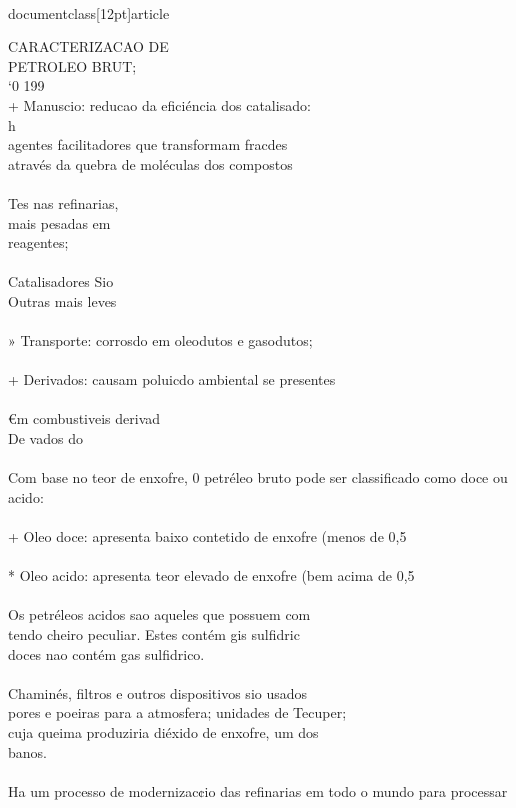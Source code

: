 \\documentclass[12pt]{article}
\begin{document}
CARACTERIZACAO DE\\
PETROLEO BRUT;\\
‘0 199\\
+ Manuscio: reducao da eficiéncia dos catalisado:\\
h\\
agentes facilitadores que transformam fracdes\\
através da quebra de moléculas dos compostos\\
\\
Tes nas refinarias,\\
mais pesadas em\\
reagentes;\\
\\
Catalisadores Sio\\
Outras mais leves\\
\\
» Transporte: corrosdo em oleodutos e gasodutos;\\
\\
+ Derivados: causam poluicdo ambiental se presentes\\
\\
€m combustiveis derivad\\
De vados do\\
\\
Com base no teor de enxofre, 0 petréleo bruto pode ser classificado como doce ou acido:\\
\\
+ Oleo doce: apresenta baixo contetido de enxofre (menos de 0,5\\%
\\
* Oleo acido: apresenta teor elevado de enxofre (bem acima de 0,5\\%
\\
Os petréleos acidos sao aqueles que possuem com\\
tendo cheiro peculiar. Estes contém gis sulfidric\\
doces nao contém gas sulfidrico.\\
\\
Chaminés, filtros e outros dispositivos sio usados\\
pores e poeiras para a atmosfera; unidades de Tecuper;\\
cuja queima produziria diéxido de enxofre, um dos\\
banos.\\
\\
Ha um processo de modernizac¢io das refinarias em todo o mundo para processar\\
\end{document}

